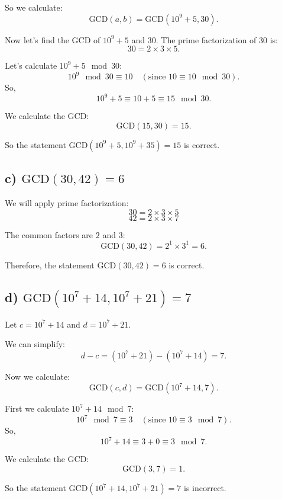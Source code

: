 \documentclass{article}
\begin{document}
So we calculate:
\[
\text{GCD}(a, b) = \text{GCD}(10^9 + 5, 30).
\]

Now let's find the GCD of \( 10^9 + 5 \) and 30. The prime factorization of 30 is:
\[
30 = 2 \times 3 \times 5.
\]

Let's calculate \( 10^9 + 5 \mod 30 \):
\[
10^9 \mod 30 \equiv 10 \quad (\text{since } 10 \equiv 10 \mod 30).
\]
So,
\[
10^9 + 5 \equiv 10 + 5 \equiv 15 \mod 30.
\]

We calculate the GCD:
\[
\text{GCD}(15, 30) = 15.
\]

So the statement \( \text{GCD}(10^9 + 5, 10^9 + 35) = 15 \) is correct.

\subsection*{c) \( \text{GCD}(30, 42) = 6 \)}

We will apply prime factorization:
\[
30 = 2 \times 3 \times 5
\]
\[
42 = 2 \times 3 \times 7
\]

The common factors are \( 2 \) and \( 3 \):
\[
\text{GCD}(30, 42) = 2^1 \times 3^1 = 6.
\]

Therefore, the statement \( \text{GCD}(30, 42) = 6 \) is correct.

\subsection*{d) \( \text{GCD}(10^7 + 14, 10^7 + 21) = 7 \)}

Let \( c = 10^7 + 14 \) and \( d = 10^7 + 21 \).

We can simplify:
\[
d - c = (10^7 + 21) - (10^7 + 14) = 7.
\]

Now we calculate:
\[
\text{GCD}(c, d) = \text{GCD}(10^7 + 14, 7).
\]

First we calculate \( 10^7 + 14 \mod 7 \):
\[
10^7 \mod 7 \equiv 3 \quad (\text{since } 10 \equiv 3 \mod 7).
\]
So,
\[
10^7 + 14 \equiv 3 + 0 \equiv 3 \mod 7.
\]

We calculate the GCD:
\[
\text{GCD}(3, 7) = 1.
\]

So the statement \( \text{GCD}(10^7 + 14, 10^7 + 21) = 7 \) is incorrect.
\end{document}
